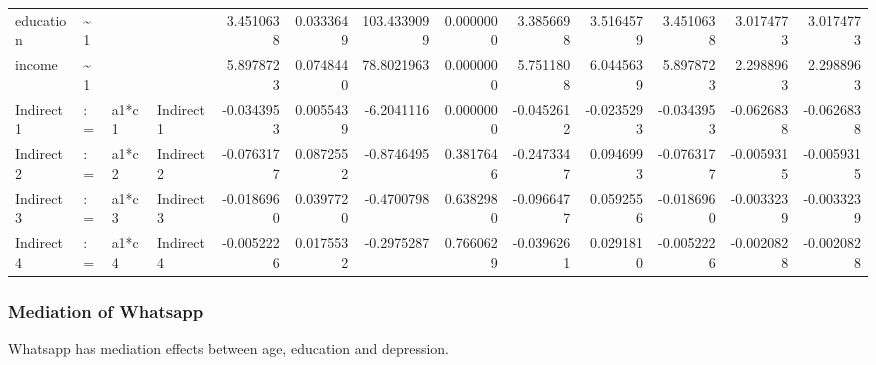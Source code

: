 \documentclass[
]{article}
\begin{document}
\begin{table}[!h]
\begin{tabular}[t]{llllrrrrrrrrr}
\addlinespace
education & \textasciitilde{}1 &  &  & 3.4510638 & 0.0333649 & 103.4339099 & 0.0000000 & 3.3856698 & 3.5164579 & 3.4510638 & 3.0174773 & 3.0174773\\
income & \textasciitilde{}1 &  &  & 5.8978723 & 0.0748440 & 78.8021963 & 0.0000000 & 5.7511808 & 6.0445639 & 5.8978723 & 2.2988963 & 2.2988963\\
Indirect1 & := & a1*c1 & Indirect1 & -0.0343953 & 0.0055439 & -6.2041116 & 0.0000000 & -0.0452612 & -0.0235293 & -0.0343953 & -0.0626838 & -0.0626838\\
Indirect2 & := & a1*c2 & Indirect2 & -0.0763177 & 0.0872552 & -0.8746495 & 0.3817646 & -0.2473347 & 0.0946993 & -0.0763177 & -0.0059315 & -0.0059315\\
Indirect3 & := & a1*c3 & Indirect3 & -0.0186960 & 0.0397720 & -0.4700798 & 0.6382980 & -0.0966477 & 0.0592556 & -0.0186960 & -0.0033239 & -0.0033239\\
\addlinespace
Indirect4 & := & a1*c4 & Indirect4 & -0.0052226 & 0.0175532 & -0.2975287 & 0.7660629 & -0.0396261 & 0.0291810 & -0.0052226 & -0.0020828 & -0.0020828\\
\bottomrule
\end{tabular}
\end{table}

\newpage

\hypertarget{mediation-of-whatsapp}{%
\subsubsection{Mediation of Whatsapp}\label{mediation-of-whatsapp}}

Whatsapp has mediation effects between age, education and depression.
\end{document}
